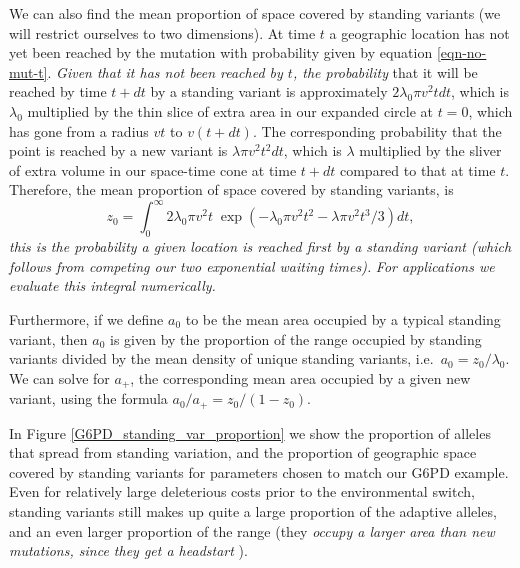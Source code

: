 \documentclass{article}
\newcommand{\gc}[1]{{\it\color{blue} #1} }
\newcommand{\mfp}[1]{{\it\color{red} #1} }
\begin{document}
We can also find the mean proportion of space covered by standing
variants (we will restrict ourselves to two dimensions).
At time $t$ a geographic location has not yet been reached by the
mutation with probability given by equation \eqref{eqn-no-mut-t}.
\mfp{Given that it has not been reached by $t$, the probability} that it will be reached by time $t+dt$ 
by a standing variant is approximately $2 \lambda_0 \pi v^2 t dt$,
which is $\lambda_0$ multiplied by the thin slice of extra area in our
expanded circle at $t=0$, which has gone from a radius $vt$ to
$v(t+dt)$. The corresponding probability that the point is reached by a new
variant is 
$\lambda \pi v^2 t^2 dt$, which is $\lambda$ multiplied by the
sliver of  extra volume in our space-time cone at time $t+dt$ compared to that at time $t$.
Therefore, the mean proportion of space covered by standing variants,
is
\begin{equation} \label{prop_space_standing}
    z_0 = \int_0^\infty {2 \lambda_0 \pi v^2 t} \; \exp \left( -
      \lambda_0 \pi v^2 t^2 - \lambda \pi v^2 t^3 / 3 \right) dt,
\end{equation}
\mfp{this is the probability a given location is reached first by a
standing variant (which follows from competing our two exponential
waiting times).}
\gc{For applications we evaluate this integral numerically.}

Furthermore, if we define $a_0$ to be the mean area occupied by a typical standing variant, 
then $a_0$ is given by the proportion of the range occupied by standing variants divided by the mean density of unique standing variants,
i.e.\ $a_0 = z_0 / \lambda_0$.
We can solve for $a_+$, the corresponding mean area occupied by a given new variant, 
using the formula $a_0 / a_+ = z_0 / (1-z_0)$.

In Figure \ref{G6PD_standing_var_proportion} we show the proportion of
alleles that spread from standing variation, and the proportion of
geographic space covered by standing variants for parameters chosen to match our G6PD example.
Even for relatively large deleterious costs prior to the environmental switch, 
standing variants still makes up quite a large proportion of the adaptive alleles, 
and an even larger proportion of the range 
(they \mfp{occupy a larger area than new mutations, since they get a
headstart}).
\end{document}
